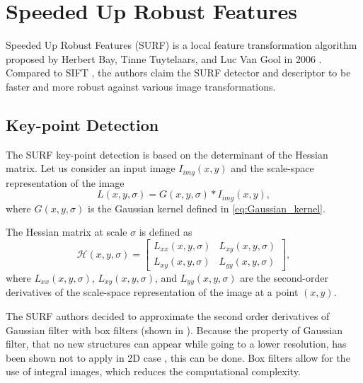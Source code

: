 \section{Speeded Up Robust Features}
Speeded Up Robust Features (SURF) is a local feature transformation algorithm proposed by Herbert Bay, Tinne Tuytelaars, and Luc Van Gool in 2006 \cite{Bay2006}. Compared to SIFT \cite{Lowe1999}, the authors claim the SURF detector and descriptor to be faster and more robust against various image transformations.

\subsection{Key-point Detection}
The SURF key-point detection is based on the determinant of the Hessian matrix. Let us consider an input image $I_{img}(x,y)$ and the scale-space representation of the image
\begin{equation}
    L(x, y,\sigma) =  G(x,y,\sigma)*I_{img}(x,y),
\end{equation}
where $G(x,y,\sigma)$ is the Gaussian kernel defined in \eqref{eq:Gaussian_kernel}.

The Hessian matrix at scale $\sigma$ is defined as
\begin{equation}
    \mathcal{H}(x, y, \sigma) =
    \begin{bmatrix}
        L_{xx}(x, y, \sigma) & L_{xy}(x, y, \sigma)\\
        L_{xy}(x, y, \sigma) & L_{yy}(x, y, \sigma)
    \end{bmatrix},
\end{equation}
where $L_{xx}(x, y, \sigma)$, $L_{xy}(x, y, \sigma)$, and $L_{yy}(x, y, \sigma)$ are the second-order derivatives of the scale-space representation of the image at a point $(x, y)$.

The SURF authors decided to approximate the second order derivatives of Gaussian filter with box filters (shown in ). Because the property of Gaussian filter, that no new structures can appear while going to a lower resolution, has been shown not to apply in 2D case \cite{Koenderink1984}, this can be done. Box filters allow for the use of integral images, which reduces the computational complexity.

